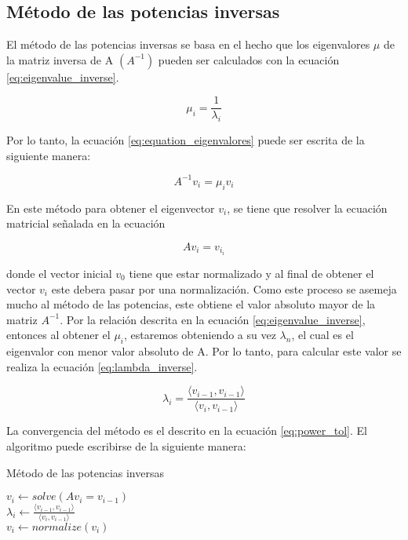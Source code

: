 \subsection{Método de las potencias inversas}

El método de las potencias inversas se basa en el hecho que los eigenvalores $\mu$ de la matriz inversa de A $(A^{-1})$ pueden ser calculados con la ecuación \ref{eq:eigenvalue_inverse}.

\begin{equation}
    \mu_i = \frac{1}{\lambda_i} \label{eq:eigenvalue_inverse}
\end{equation}

Por lo tanto, la ecuación \ref{eq:equation_eigenvalores} puede ser escrita de la siguiente manera:

\begin{equation}
    A^{-1} v_i = \mu_i  v_i
\end{equation}

En este método para obtener el eigenvector $v_i$, se tiene que resolver la ecuación matricial señalada en la ecuación

\begin{equation}
    Av_{i} = v_{i_i}
\end{equation}

donde el vector inicial $v_0$ tiene que estar normalizado y al final de obtener el vector $v_{i}$ este debera pasar por una normalización. Como este proceso se asemeja mucho al método de las potencias, este obtiene el valor absoluto mayor de la matriz $A^{-1}$. Por la relación descrita en la ecuación \ref{eq:eigenvalue_inverse}, entonces al obtener el $\mu_i$, estaremos obteniendo a su vez $\lambda_n$, el cual es el eigenvalor con menor valor absoluto de A. Por lo tanto, para calcular este valor se realiza la ecuación \ref{eq:lambda_inverse}.

\begin{equation}
    \lambda_i = \frac{\langle v_{i-1}, v_{i-1}\rangle}{\langle v_i , v_{i-1}\rangle} \label{eq:lambda_inverse}
\end{equation}

La convergencia del método es el descrito en la ecuación \ref{eq:power_tol}. El algoritmo puede escribirse de la siguiente manera:

\begin{algorithm}[H]
    \caption{Método de las potencias inversas}
    \label{alg:power_inverse_method}
    {
    $v_i \gets solve(Av_{i}=v_{i-1})$\\
    $\lambda_i \gets \frac{\langle v_{i-1} , v_{i-1}\rangle}{\langle v_{i}, v_{i-1}\rangle}$\\
    $v_i \gets normalize(v_i)$\\
    }
\end{algorithm}